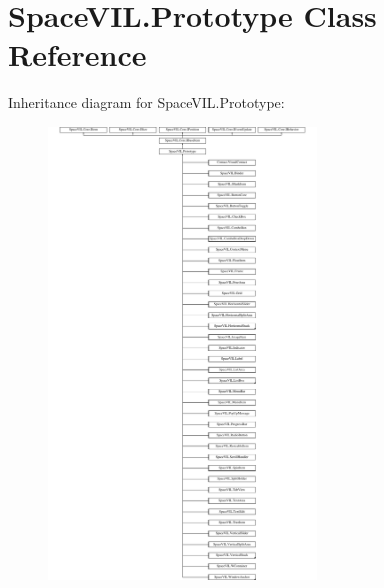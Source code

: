 \hypertarget{class_space_v_i_l_1_1_prototype}{}\section{Space\+V\+I\+L.\+Prototype Class Reference}
\label{class_space_v_i_l_1_1_prototype}
Inheritance diagram for Space\+V\+I\+L.\+Prototype\+:\begin{figure}[H]
\begin{center}
\leavevmode
\includegraphics[height=12.000000cm]{class_space_v_i_l_1_1_prototype}
\end{center}
\end{figure}
